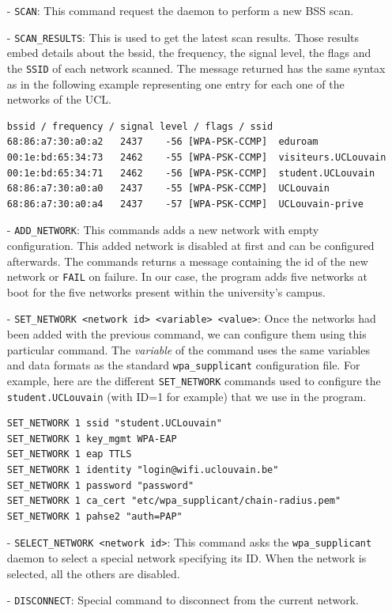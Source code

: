 \begin{itemize}
	\item[-] \texttt{SCAN}: This command request the daemon to perform a new BSS scan.

	\item[-] \texttt{SCAN\_RESULTS}: This is used to get the latest scan results. Those results embed details about the bssid, the frequency, the signal level, the flags and the \texttt{SSID} of each network scanned. The message returned has the same syntax as in the following example representing one entry for each one of the networks of the UCL.\\

\begin{lstlisting}[frame=single,breaklines=true,caption={Scan results message example}]
bssid / frequency / signal level / flags / ssid
68:86:a7:30:a0:a2	2437	-56	[WPA-PSK-CCMP]	eduroam
00:1e:bd:65:34:73	2462	-55	[WPA-PSK-CCMP]	visiteurs.UCLouvain
00:1e:bd:65:34:71 	2462	-56	[WPA-PSK-CCMP]	student.UCLouvain
68:86:a7:30:a0:a0 	2437	-55	[WPA-PSK-CCMP]	UCLouvain
68:86:a7:30:a0:a4 	2437	-57	[WPA-PSK-CCMP]	UCLouvain-prive
\end{lstlisting}

	\item[-] \texttt{ADD\_NETWORK}: This commands adds a new network with empty configuration. This added network is disabled at first and can be configured afterwards. The commands returns a message containing the id of the new network or \texttt{FAIL} on failure. In our case, the program adds five networks at boot for the five networks present within the university's campus.

	\item[-] \texttt{SET\_NETWORK <network id> <variable> <value>}: Once the networks had been added with the previous command, we can configure them using this particular command. The \textit{variable} of the command uses the same variables and data formats as the standard \texttt{wpa\_supplicant} configuration file. For example, here are the different \texttt{SET\_NETWORK} commands used to configure the \texttt{student.UCLouvain} (with ID=1 for example) that we use in the program.\\

\begin{lstlisting}[frame=single,breaklines=true,caption={Configuration of the \texttt{student.UCLouvain} network}]
SET_NETWORK 1 ssid "student.UCLouvain"
SET_NETWORK 1 key_mgmt WPA-EAP
SET_NETWORK 1 eap TTLS
SET_NETWORK 1 identity "login@wifi.uclouvain.be"
SET_NETWORK 1 password "password"
SET_NETWORK 1 ca_cert "etc/wpa_supplicant/chain-radius.pem"
SET_NETWORK 1 pahse2 "auth=PAP"
\end{lstlisting}

	\item[-] \texttt{SELECT\_NETWORK <network id>}: This command asks the \texttt{wpa\_supplicant} daemon to select a special network specifying its ID. When the network is selected, all the others are disabled.

	\item[-] \texttt{DISCONNECT}: Special command to disconnect from the current network.
\end{itemize}

